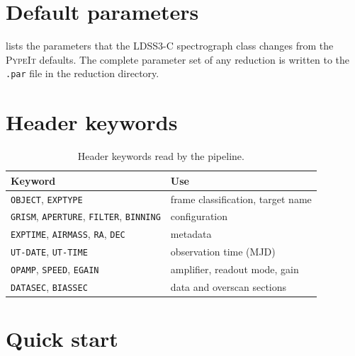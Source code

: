 \documentclass[11pt,a4paper]{article}
\newcommand{\pypeit}{\textsc{PypeIt}}
\newcommand{\code}[1]{\texttt{#1}}
\begin{document}
\section{Default parameters}
\label{app:params}

 lists the parameters that the LDSS3-C spectrograph class
changes from the \pypeit{} defaults. The complete parameter set of any
reduction is written to the \code{.par} file in the reduction directory.



\section{Header keywords}
\label{app:header}

\begin{table}[h]
  \centering\small
  \caption{Header keywords read by the pipeline.}
  \label{tab:header}
  \begin{tabular}{ll}
    \toprule
    Keyword & Use \\
    \midrule
    \code{OBJECT}, \code{EXPTYPE} & frame classification, target name \\
    \code{GRISM}, \code{APERTURE}, \code{FILTER}, \code{BINNING} & configuration \\
    \code{EXPTIME}, \code{AIRMASS}, \code{RA}, \code{DEC} & metadata \\
    \code{UT-DATE}, \code{UT-TIME} & observation time (MJD) \\
    \code{OPAMP}, \code{SPEED}, \code{EGAIN} & amplifier, readout mode, gain \\
    \code{DATASEC}, \code{BIASSEC} & data and overscan sections \\
    \bottomrule
  \end{tabular}
\end{table}

\section{Quick start}
\label{app:quickstart}
\end{document}
